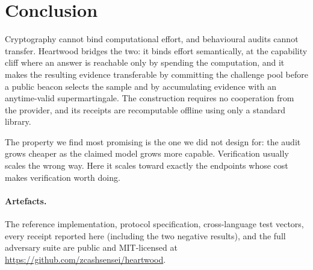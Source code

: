\documentclass[11pt]{article}
\theoremstyle{definition}
\begin{document}
\section{Conclusion}

Cryptography cannot bind computational effort, and behavioural audits cannot
transfer. Heartwood bridges the two: it binds effort semantically, at the
capability cliff where an answer is reachable only by spending the computation,
and it makes the resulting evidence transferable by committing the challenge pool
before a public beacon selects the sample and by accumulating evidence with an
anytime-valid supermartingale. The construction requires no cooperation from the
provider, and its receipts are recomputable offline using only a standard
library.

The property we find most promising is the one we did not design for: the audit
grows cheaper as the claimed model grows more capable. Verification usually
scales the wrong way. Here it scales toward exactly the endpoints whose cost
makes verification worth doing.

\paragraph{Artefacts.} The reference implementation, protocol specification,
cross-language test vectors, every receipt reported here (including the two
negative results), and the full adversary suite are public and MIT-licensed at
\url{https://github.com/zcashsensei/heartwood}.
\end{document}
